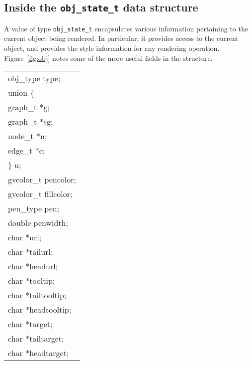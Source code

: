 \subsection{Inside the {\tt obj\_state\_t} data structure}
\label{sec:obj}
A value of type {\tt obj\_state\_t} encapsulates various information
pertaining to the current object being rendered. In particular, it
provides access to the current object, and provides the style
information for any rendering operation.
Figure~\ref{fig:obj} notes some of the more useful fields in the
structure. 
\begin{figure*}[htb]
\centering
\begin{tabular}{|l|} \hline
obj\_type type; \\
union \{ \\
\multicolumn{1}{|l|}{\hspace{2em}graph\_t *g;} \\
\multicolumn{1}{|l|}{\hspace{2em}graph\_t *sg;} \\
\multicolumn{1}{|l|}{\hspace{2em}node\_t *n;} \\
\multicolumn{1}{|l|}{\hspace{2em}edge\_t *e;} \\
\} u; \\
gvcolor\_t pencolor; \\
gvcolor\_t fillcolor; \\
pen\_type pen;   \\
double penwidth; \\
char *url; \\
char *tailurl;  \\
char *headurl;  \\
char *tooltip; \\
char *tailtooltip; \\
char *headtooltip; \\
char *target; \\
char *tailtarget; \\
char *headtarget; \\
\hline
\end{tabular}
\caption{Some fields in {\tt obj\_state\_t}}
\label{fig:obj}
\end{figure*}


